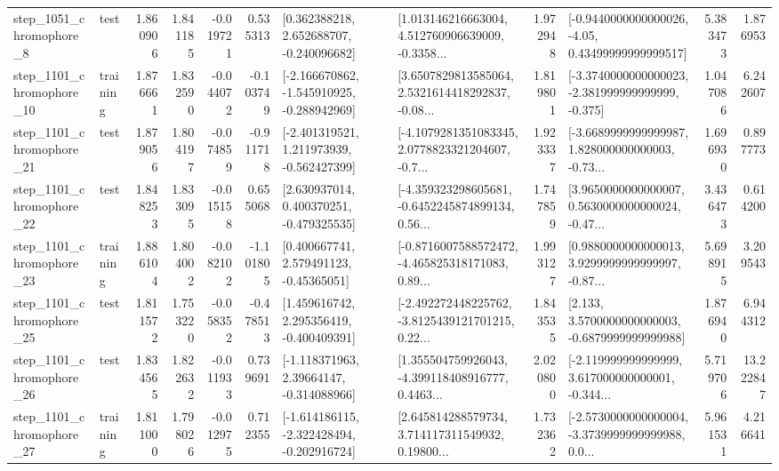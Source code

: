 \begin{tabular}{llrrrrllrlrr}
  step\_1051\_chromophore\_8 &      test &      1.860906 &    1.841185 &     -0.019721 &  0.535313 &    [0.362388218, 2.652688707, -0.240096682] &  [1.013146216663004, 4.512760906639009, -0.3358... &       1.972948 &  [-0.9440000000000026, -4.05, 0.43499999999999517] &            5.383473 &          1.876953 \\
 step\_1101\_chromophore\_10 &  training &      1.876661 &    1.832590 &     -0.044072 & -0.103749 &  [-2.166670862, -1.545910925, -0.288942969] &  [3.6507829813585064, 2.5321614418292837, -0.08... &       1.819801 &  [-3.3740000000000023, -2.381999999999999, -0.375] &            1.047086 &          6.242607 \\
 step\_1101\_chromophore\_21 &      test &      1.879056 &    1.804197 &     -0.074859 & -0.911718 &   [-2.401319521, 1.211973939, -0.562427399] &  [-4.1079281351083345, 2.0778823321204607, -0.7... &       1.923337 &  [-3.6689999999999987, 1.828000000000003, -0.73... &            1.696930 &          0.897773 \\
 step\_1101\_chromophore\_22 &      test &      1.848253 &    1.833095 &     -0.015158 &  0.655068 &    [2.630937014, 0.400370251, -0.479325535] &  [-4.359323298605681, -0.6452245874899134, 0.56... &       1.747859 &  [3.9650000000000007, 0.5630000000000024, -0.47... &            3.436473 &          0.614200 \\
 step\_1101\_chromophore\_23 &  training &      1.886104 &    1.804002 &     -0.082102 & -1.101805 &     [0.400667741, 2.579491123, -0.45365051] &  [-0.8716007588572472, -4.465825318171083, 0.89... &       1.993127 &  [0.9880000000000013, 3.9299999999999997, -0.87... &            5.698915 &          3.209543 \\
 step\_1101\_chromophore\_25 &      test &      1.811572 &    1.753220 &     -0.058352 & -0.478513 &    [1.459616742, 2.295356419, -0.400409391] &  [-2.492272448225762, -3.8125439121701215, 0.22... &       1.843535 &   [2.133, 3.5700000000000003, -0.6879999999999988] &            1.876940 &          6.944312 \\
 step\_1101\_chromophore\_26 &      test &      1.834565 &    1.822632 &     -0.011933 &  0.739691 &    [-1.118371963, 2.39664147, -0.314088966] &  [1.355504759926043, -4.399118408916777, 0.4463... &       2.020800 &  [-2.119999999999999, 3.617000000000001, -0.344... &            5.719706 &         13.222847 \\
 step\_1101\_chromophore\_27 &  training &      1.811000 &    1.798026 &     -0.012975 &  0.712355 &  [-1.614186115, -2.322428494, -0.202916724] &  [2.645814288579734, 3.714117311549932, 0.19800... &       1.732362 &  [-2.5730000000000004, -3.3739999999999988, 0.0... &            5.961531 &          4.216641 \\

\end{tabular}
